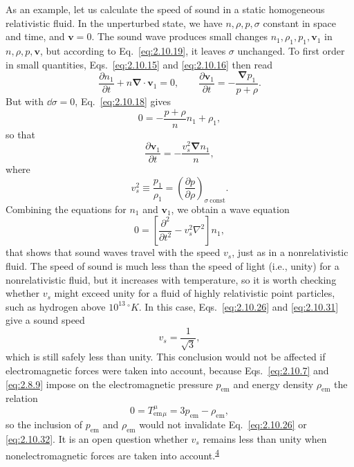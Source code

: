As an example, let us calculate the speed of sound in a static homogeneous
relativistic fluid. In the unperturbed state, we have \(n,\rho,p,\sigma\)
constant in space and time, and \(\mathbf v=0\). The sound wave produces small
changes \(n_1,\rho_1,p_1,\mathbf v_1\) in \(n,\rho,p,\mathbf v\), but
according to Eq.~\eqref{eq:2.10.19}, it leaves \(\sigma\) unchanged. To first
order in small quantities, Eqs.~\eqref{eq:2.10.15} and
\eqref{eq:2.10.16} then read
\[
  \frac{\partial n_1}{\partial t}
  +n\boldsymbol{\nabla}\cdot\mathbf v_1=0,
  \qquad
  \frac{\partial\mathbf v_1}{\partial t}
  =-\frac{\boldsymbol{\nabla}p_1}{p+\rho}.
\]
But with \(\dd\sigma=0\), Eq.~\eqref{eq:2.10.18} gives
\[
  0=-\frac{p+\rho}{n}n_1+\rho_1,
\]
so that
\[
  \frac{\partial\mathbf v_1}{\partial t}
  =-\frac{v_s^2\boldsymbol{\nabla}n_1}{n},
\]
where
\begin{equation}
  v_s^2\equiv\frac{p_1}{\rho_1}
  =\left(\frac{\partial p}{\partial\rho}\right)_{\sigma\ \mathrm{const}}.
  \tag{2.10.31}\label{eq:2.10.31}
\end{equation}
Combining the equations for \(n_1\) and \(\mathbf v_1\), we obtain a wave
equation
\[
  0=\left[
    \frac{\partial^2}{\partial t^2}
    -v_s^2\nabla^2
  \right]n_1,
\]
that shows that sound waves travel with the speed \(v_s\), just as in a
nonrelativistic fluid. The speed of sound is much less than the speed of light
(i.e., unity) for a nonrelativistic fluid, but it increases with temperature, so
it is worth checking whether \(v_s\) might exceed unity for a fluid of highly
relativistic point particles, such as hydrogen above \(10^{13}\,{}^\circ\!K\).
In this case, Eqs.~\eqref{eq:2.10.26} and \eqref{eq:2.10.31} give a sound
speed
\begin{equation}
  v_s=\frac1{\sqrt3},
  \tag{2.10.32}\label{eq:2.10.32}
\end{equation}
which is still safely less than unity. This conclusion would not be affected if
electromagnetic forces were taken into account, because Eqs.~\eqref{eq:2.10.7}
and \eqref{eq:2.8.9} impose on the electromagnetic pressure
\(p_{\mathrm{em}}\) and energy density \(\rho_{\mathrm{em}}\) the relation
\begin{equation}
  0=T_{\mathrm{em}}^\mu{}_\mu
  =3p_{\mathrm{em}}-\rho_{\mathrm{em}},
  \tag{2.10.33}\label{eq:2.10.33}
\end{equation}
so the inclusion of \(p_{\mathrm{em}}\) and \(\rho_{\mathrm{em}}\) would not
invalidate Eq.~\eqref{eq:2.10.26} or \eqref{eq:2.10.32}. It is an open
question whether \(v_s\) remains less than unity when nonelectromagnetic forces
are taken into account.\textsuperscript{\hyperref[ch2-ref-4]{4}}
